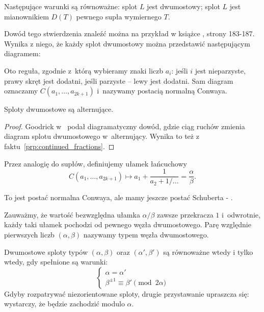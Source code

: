 \begin{proposition}
    Następujące warunki są równoważne: splot $L$ jest dwumostowy; splot $L$ jest mianownikiem $D(T)$ pewnego supła wymiernego $T$.
\end{proposition}

Dowód tego stwierdzenia znaleźć można na przykład w książce \cite{murasugi1996}, strony 183-187.
Wynika z niego, że każdy splot dwumostowy można przedstawić następującym diagramem:


Oto reguła, zgodnie z~którą wybieramy znaki liczb $a_i$:
jeśli $i$ jest nieparzyste, prawy skręt jest dodatni, jeśli parzyste -- lewy jest dodatni.
Sam diagram oznaczamy $C(a_1, \ldots, a_{2k+1})$ i~nazywamy postacią normalną Conwaya.


\begin{proposition}
    Sploty dwumostowe są alternujące.
\end{proposition}

\begin{proof}
    Goodrick w~\cite{goodrick1972} podał diagramatyczny dowód, gdzie ciąg ruchów zmienia diagram splotu dwumostowego w~alternujący.
    Wynika to też z faktu~\ref{prp:continued_fractions}.
\end{proof}

Przez analogię do supłów, definiujemy ułamek łańcuchowy
\begin{equation}
    C(a_1, \ldots, a_{2k+1}) \mapsto a_1 + \frac{1}{a_2 + 1/\ldots} = \frac \alpha \beta.
\end{equation}

\begin{tobedone}
%
%
    To jest postać normalna Conwaya, ale mamy jeszcze postać Schuberta - \cite[s. 21]{kawauchi1996}.
\end{tobedone}

Zauważmy, że wartość bezwzględna ułamka $\alpha/\beta$ zawsze przekracza $1$ i~odwrotnie, każdy taki ułamek pochodzi od pewnego węzła dwumostowego.
Parę względnie pierwszych liczb $(\alpha, \beta)$ nazywamy typem węzła dwumostowego.

\begin{proposition}
    \label{prp:tangle_equivalence}
    Dwumostowe sploty typów $(\alpha, \beta)$ oraz $(\alpha', \beta')$ są równoważne wtedy i tylko wtedy, gdy spełnione są warunki:
    \begin{equation}
        \begin{cases}
            \alpha = \alpha' \\
            \beta^{\pm 1} \equiv \beta' \pmod {2 \alpha}
        \end{cases}
    \end{equation}
    Gdyby rozpatrywać niezorientowane sploty, drugie przystawanie upraszcza się: wystarczy, że będzie zachodzić modulo $\alpha$.
\end{proposition}


